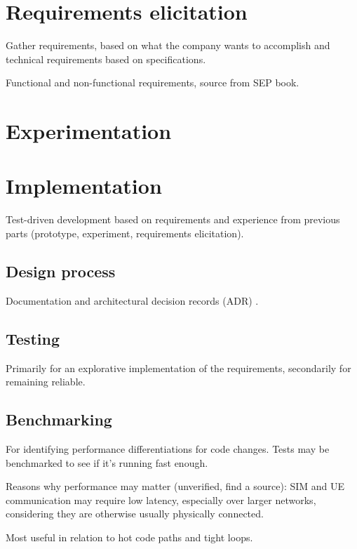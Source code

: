 \section{Requirements elicitation}
\label{sec:requirements-elicitation}

Gather requirements, based on what the company wants to
accomplish and technical requirements based on specifications.

Functional and non-functional requirements, source from 
SEP book.

\section{Experimentation}
\label{sec:experimentation}

\section{Implementation}
\label{sec:implementation}

Test-driven development based on requirements and experience from
previous parts (prototype, experiment, requirements elicitation).

\subsection{Design process}

Documentation and architectural decision records (ADR)
\cite{adr, adr-github}.

\subsection{Testing}

Primarily for an explorative implementation of the requirements,
secondarily for remaining reliable.

\subsection{Benchmarking}

For identifying performance differentiations for code changes.
Tests may be benchmarked to see if it's running fast enough.

Reasons why performance may matter (unverified, find a source):
SIM and UE communication may require low latency, especially over
larger networks, considering they are otherwise usually
physically connected.

Most useful in relation to hot code paths and tight loops.

